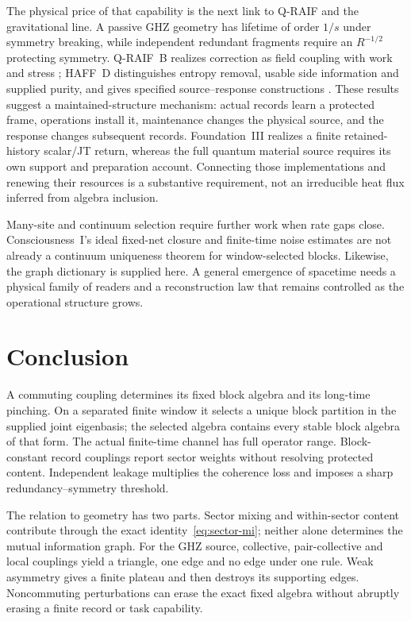 \documentclass[12pt,a4paper]{article}
\begin{document}
The physical price of that capability is the next link to Q-RAIF
and the gravitational line. A passive GHZ geometry has lifetime
of order $1/s$ under symmetry breaking, while independent
redundant fragments require an $R^{-1/2}$ protecting symmetry.
Q-RAIF~B realizes correction as field coupling with work and stress
\cite{Liu2026QRAIFB}; HAFF~D distinguishes entropy removal,
usable side information and supplied purity, and gives specified
source--response constructions \cite{Liu2026PaperD}.
These results suggest a maintained-structure mechanism:
actual records learn a protected frame, operations install it,
maintenance changes the physical source, and the response changes
subsequent records. Foundation~III realizes a finite retained-history
scalar/JT return, whereas the full quantum material source requires
its own support and preparation account. Connecting those
implementations and renewing their resources is a substantive
requirement, not an irreducible heat flux inferred from algebra
inclusion.

Many-site and continuum selection require further work when rate
gaps close. Consciousness~I's ideal fixed-net closure and finite-time
noise estimates are not already a continuum uniqueness theorem for
window-selected blocks. Likewise, the graph dictionary is supplied
here. A general emergence of spacetime needs a physical family of
readers and a reconstruction law that remains controlled as the
operational structure grows.

\section{Conclusion}
\label{sec:conclusion}

A commuting coupling determines its fixed block algebra and its
long-time pinching. On a separated finite window it selects a
unique block partition in the supplied joint eigenbasis; the
selected algebra contains every stable block algebra of that form.
The actual finite-time channel has full operator range.
Block-constant record couplings report sector weights without
resolving protected content. Independent leakage multiplies the
coherence loss and imposes a sharp redundancy--symmetry threshold.

The relation to geometry has two parts. Sector mixing and
within-sector content contribute through the exact
identity~\eqref{eq:sector-mi}; neither alone determines the mutual
information graph. For the GHZ source, collective, pair-collective
and local couplings yield a triangle, one edge and no edge under
one rule. Weak asymmetry gives a finite plateau and then destroys
its supporting edges. Noncommuting perturbations can erase the
exact fixed algebra without abruptly erasing a finite record or
task capability.
\end{document}
